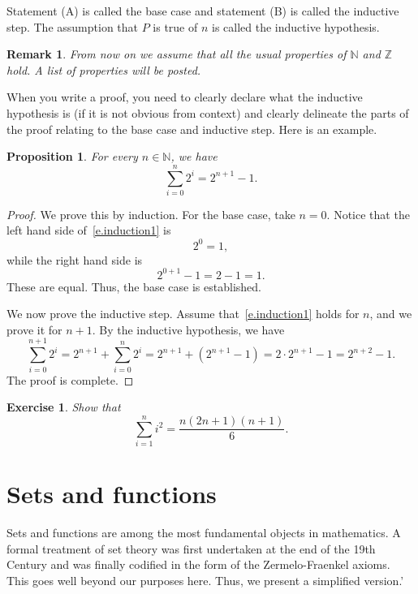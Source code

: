 \documentclass{amsart}
\newtheorem{proposition}[theorem]{Proposition}
\newtheorem{remark}[theorem]{Remark}
\newtheorem{exercise}[theorem]{Exercise}
\newcommand{\N}{\mathbb N}
\newcommand{\Z}{\mathbb Z}
\newcommand{\1}{\mathds{1}}
\def \N {{\mathbb {N}}}
\def \Z {{\mathbb {Z}}}
\numberwithin{equation}{section}
\numberwithin{theorem}{section}
\begin{document}
Statement (A) is called the base case and statement (B) is called the inductive step.  The assumption that $P$ is true of $n$ is called the inductive hypothesis.


\begin{remark}
From now on we assume that all the usual properties of $\N$ and $\Z$ hold. A list of properties will be posted.
\end{remark}

When you write a proof, you need to clearly declare what the inductive hypothesis is (if it is not obvious from context) and clearly delineate the parts of the proof relating to the base case and inductive step.  Here is an example.
\begin{proposition}
	For every $n\in \N$, we have
	\begin{equation}\label{e.induction1}
		\sum_{i=0}^n 2^i = 2^{n+1} - 1.
	\end{equation}
\end{proposition}
\begin{proof}
	We prove this by induction.  For the base case, take $n=0$.  Notice that the left hand side of~\eqref{e.induction1} is
	\[
		2^0 = 1,
	\]
	while the right hand side is
	\[
		2^{0+1} -1 = 2 - 1 = 1.
	\]
	These are equal. Thus, the base case is established.
	
	We now prove the inductive step. Assume that~\eqref{e.induction1} holds for $n$, and we prove it for $n+1$.  By the inductive hypothesis, we have
	\[
		\sum_{i=0}^{n+1} 2^i
			= 2^{n+1} + \sum_{i=0}^n 2^i
			= 2^{n+1} + \left(2^{n+1} - 1\right)
			= 2 \cdot 2^{n+1} - 1
			= 2^{n+2} - 1.
	\]
	The proof is complete.
\end{proof}






\begin{exercise}
	Show that
	\[
		\sum_{i=1}^n i^2
			= \frac{n(2n+1)(n+1)}{6}.
	\]
\end{exercise}











\bigskip \section{Sets and functions}


Sets and functions are among the most fundamental objects in mathematics.  A formal treatment
of set theory was first undertaken at the end of the 19th Century and was finally codified
in the form of the Zermelo-Fraenkel axioms.  
This goes well beyond our purposes here.
Thus, we present a simplified version.'
\end{document}

